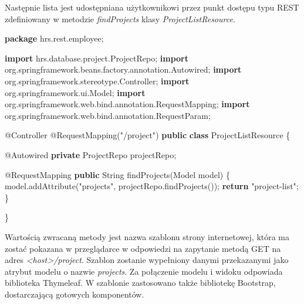 \documentclass[]{article}
\newenvironment{Shaded}{}{}
\newcommand{\AttributeTok}[1]{\textcolor[rgb]{0.49,0.56,0.16}{#1}}
\newcommand{\BuiltInTok}[1]{#1}
\newcommand{\FunctionTok}[1]{\textcolor[rgb]{0.02,0.16,0.49}{#1}}
\newcommand{\ImportTok}[1]{#1}
\newcommand{\KeywordTok}[1]{\textcolor[rgb]{0.00,0.44,0.13}{\textbf{#1}}}
\newcommand{\NormalTok}[1]{#1}
\newcommand{\StringTok}[1]{\textcolor[rgb]{0.25,0.44,0.63}{#1}}
\begin{document}
Następnie lista jest udostępniana użytkownikowi przez punkt dostępu typu
REST zdefiniowany w metodzie \emph{findProjects} klasy
\emph{ProjectListResource}.

\begin{Shaded}
\begin{Highlighting}[]
\KeywordTok{package}\ImportTok{ hrs.rest.employee;}

\KeywordTok{import}\ImportTok{ hrs.database.project.ProjectRepo;}
\KeywordTok{import}\ImportTok{ org.springframework.beans.factory.annotation.Autowired;}
\KeywordTok{import}\ImportTok{ org.springframework.stereotype.Controller;}
\KeywordTok{import}\ImportTok{ org.springframework.ui.Model;}
\KeywordTok{import}\ImportTok{ org.springframework.web.bind.annotation.RequestMapping;}
\KeywordTok{import}\ImportTok{ org.springframework.web.bind.annotation.RequestParam;}

\AttributeTok{@Controller}
\AttributeTok{@RequestMapping}\NormalTok{(}\StringTok{"/project"}\NormalTok{)}
\KeywordTok{public} \KeywordTok{class}\NormalTok{ ProjectListResource \{}

    \AttributeTok{@Autowired}
    \KeywordTok{private}\NormalTok{ ProjectRepo projectRepo;}

    \AttributeTok{@RequestMapping}
    \KeywordTok{public} \BuiltInTok{String} \FunctionTok{findProjects}\NormalTok{(Model model) \{}
\NormalTok{        model.}\FunctionTok{addAttribute}\NormalTok{(}\StringTok{"projects"}\NormalTok{, projectRepo.}\FunctionTok{findProjects}\NormalTok{());}
        \KeywordTok{return} \StringTok{"project-list"}\NormalTok{;}
\NormalTok{    \}}

\NormalTok{\}}
\end{Highlighting}
\end{Shaded}

Wartością zwracaną metody jest nazwa szablonu strony internetowej, która
ma zostać pokazana w przeglądarce w odpowiedzi na zapytanie metodą GET
na adres \emph{\textless{}host\textgreater{}/project}. Szablon zostanie
wypełniony danymi przekazanymi jako atrybut modelu o nazwie
\emph{projects}. Za połączenie modelu i widoku odpowiada biblioteka
Thymeleaf. W szablonie zastosowano także bibliotekę Bootstrap,
dostarczającą gotowych komponentów.
\end{document}
